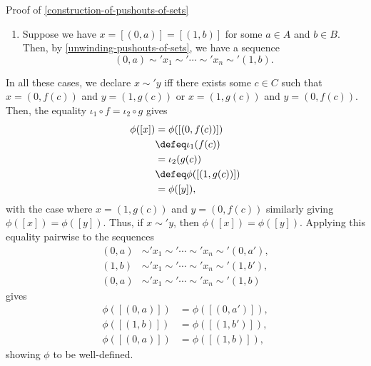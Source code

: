 \begin{Proof}{Proof of \cref{construction-of-pushouts-of-sets}}
\begin{enumerate}
            \[
                (1,b)\sim'x_{1}\sim'\cdots\sim'x_{n}\sim'(1,b').%
            \]%
        \item\label{proof-of-construction-of-pushouts-of-sets-case-3}Suppose we have $x=[(0,a)]=[(1,b)]$ for some $a\in A$ and $b\in B$. Then, by \cref{unwinding-pushouts-of-sets}, we have a sequence
            \[
                (0,a)\sim'x_{1}\sim'\cdots\sim'x_{n}\sim'(1,b).%
            \]%
    \end{enumerate}
    In all these cases, we declare $x\sim'y$ iff there exists some $c\in C$ such that $x=(0,f(c))$ and $y=(1,g(c))$ or $x=(1,g(c))$ and $y=(0,f(c))$. Then, the equality $\iota_{1}\circ f=\iota_{2}\circ g$ gives
    \begin{align*}
        \phi([x]) &=      \phi([(0,f(c))])\\
                  &\defeq \iota_{1}(f(c))\\
                  &=      \iota_{2}(g(c))\\
                  &\defeq \phi([(1,g(c))])\\
                  &=      \phi([y]),
    \end{align*}
    with the case where $x=(1,g(c))$ and $y=(0,f(c))$ similarly giving $\phi([x])=\phi([y])$. Thus, if $x\sim'y$, then $\phi([x])=\phi([y])$. Applying this equality pairwise to the sequences
    \begin{align*}
        (0,a)&\sim'x_{1}\sim'\cdots\sim'x_{n}\sim'(0,a'),\\%
        (1,b)&\sim'x_{1}\sim'\cdots\sim'x_{n}\sim'(1,b'),\\%
        (0,a)&\sim'x_{1}\sim'\cdots\sim'x_{n}\sim'(1,b)%
    \end{align*}
    gives
    \begin{align*}
        \phi([(0,a)]) &= \phi([(0,a')]),\\
        \phi([(1,b)]) &= \phi([(1,b')]),\\
        \phi([(0,a)]) &= \phi([(1,b)]),
    \end{align*}
    showing $\phi$ to be well-defined.
\end{Proof}
